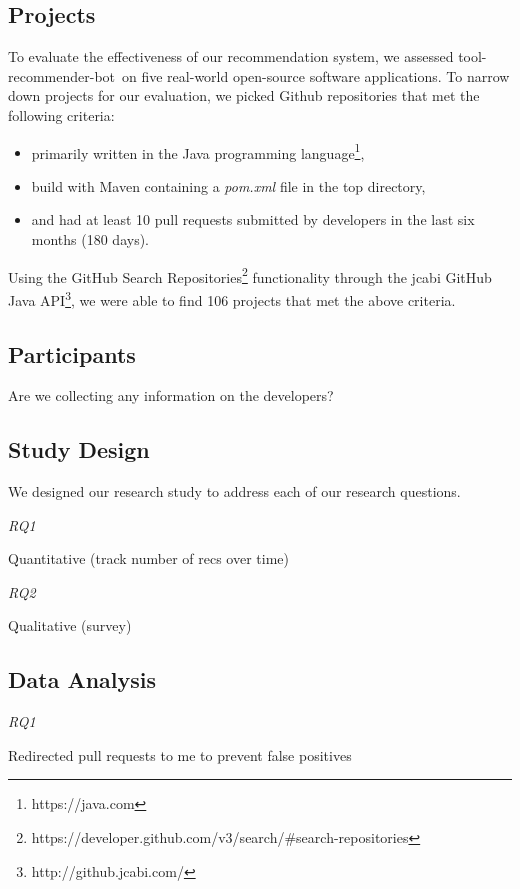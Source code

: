 \documentclass[conference]{IEEEtran}
\newcommand{\tool}{tool-recommender-bot}
\newcommand{\pseudosubsection}[1]{\vspace{2mm} {\it #1}}
\begin{document}
\subsection{Projects}

To evaluate the effectiveness of our recommendation system, we assessed \tool~on five real-world open-source software applications. To narrow down projects for our evaluation, we picked Github repositories that met the following criteria:

\begin{itemize}
\item primarily written in the Java programming language\footnote{https://java.com},
\item build with Maven containing a \textit{pom.xml} file in the top directory,
\item and had at least 10 pull requests submitted by developers in the last six months (180 days).
\end{itemize}

Using the GitHub Search Repositories\footnote{https://developer.github.com/v3/search/\#search-repositories} functionality through the jcabi GitHub Java API\footnote{http://github.jcabi.com/}, we were able to find 106 projects that met the above criteria.

\subsection{Participants}

Are we collecting any information on the developers?

\subsection{Study Design}

We designed our research study to address each  of our research questions.

\pseudosubsection{RQ1}

Quantitative (track number of recs over time)

\pseudosubsection{RQ2}

Qualitative (survey)

\subsection{Data Analysis}


\pseudosubsection{RQ1}

Redirected pull requests to me to prevent false positives
\end{document}
